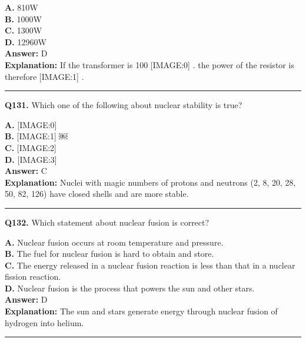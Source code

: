 \documentclass[12pt]{article}
\begin{document}
\textbf{A.} 810W \\
\textbf{B.} 1000W \\
\textbf{C.} 1300W \\
\textbf{D.} 12960W \\

\textbf{Answer:} D \\
\textbf{Explanation:} If the transformer is 100%
[IMAGE:0]
. the power of the resistor is therefore
[IMAGE:1]
.

\hrule
\vspace{1em}


\noindent
\textbf{Q131.} Which one of the following about nuclear stability is true?



\textbf{A.} [IMAGE:0] \\
\textbf{B.} [IMAGE:1]
￼ \\
\textbf{C.} [IMAGE:2] \\
\textbf{D.} [IMAGE:3] \\

\textbf{Answer:} C \\
\textbf{Explanation:} Nuclei with magic numbers of protons and neutrons (2, 8, 20, 28, 50, 82, 126) have closed shells and are more stable.

\hrule
\vspace{1em}


\noindent
\textbf{Q132.} Which statement about nuclear fusion is correct?



\textbf{A.} Nuclear fusion occurs at room temperature and pressure. \\
\textbf{B.} The fuel for nuclear fusion is hard to obtain and store. \\
\textbf{C.} The energy released in a nuclear fusion reaction is less than that in a nuclear fission reaction. \\
\textbf{D.} Nuclear fusion is the process that powers the sun and other stars. \\

\textbf{Answer:} D \\
\textbf{Explanation:} The sun and stars generate energy through nuclear fusion of hydrogen into helium.

\hrule
\vspace{1em}
\end{document}
